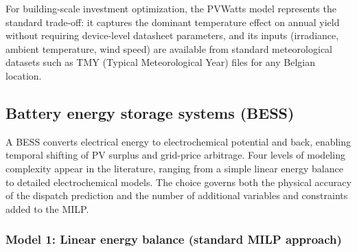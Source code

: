 \documentclass[11pt,a4paper]{report}
\begin{document}
\begin{table}[H]
\centering
\caption{Comparison of PV generation models used in building energy optimization.}
\label{tab:pv_model_comparison}
\end{table}

\noindent For building-scale investment optimization, the PVWatts model represents the standard trade-off: it captures the dominant temperature effect on annual yield without requiring device-level datasheet parameters, and its inputs (irradiance, ambient temperature, wind speed) are available from standard meteorological datasets such as TMY (Typical Meteorological Year) files for any Belgian location.
\subsection{Battery energy storage systems (BESS)}
\label{sub:battery_modeling}

A BESS converts electrical energy to electrochemical potential and back, enabling temporal shifting of PV surplus and grid-price arbitrage.
Four levels of modeling complexity appear in the literature, ranging from a simple linear energy balance to detailed electrochemical models.
The choice governs both the physical accuracy of the dispatch prediction and the number of additional variables and constraints added to the MILP.

\subsubsection{Model 1: Linear energy balance (standard MILP approach)}
\label{subsub:bess_linear}
\end{document}
